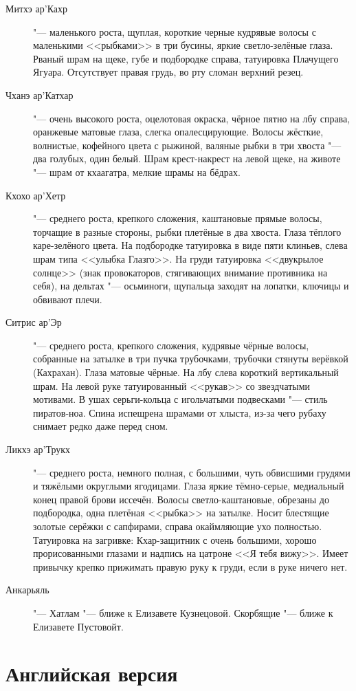 \begin{description}
\item[Митхэ ар'Кахр] "--- маленького роста, щуплая, короткие черные кудрявые волосы с маленькими <<рыбками>> в три бусины, яркие светло-зелёные глаза.
Рваный шрам на щеке, губе и подбородке справа, татуировка Плачущего Ягуара.
Отсутствует правая грудь, во рту сломан верхний резец.
\item[Чханэ ар'Катхар] "--- очень высокого роста, оцелотовая окраска, чёрное пятно на лбу справа, оранжевые матовые глаза, слегка опалесцирующие.
Волосы жёсткие, волнистые, кофейного цвета с рыжиной, валяные рыбки в три хвоста "--- два голубых, один белый.
Шрам крест-накрест на левой щеке, на животе "--- шрам от кхаагатра, мелкие шрамы на бёдрах.
\item[Кхохо ар'Хетр] "--- среднего роста, крепкого сложения, каштановые прямые волосы, торчащие в разные стороны, рыбки плетёные в два хвоста.
Глаза тёплого каре-зелёного цвета.
На подбородке татуировка в виде пяти клиньев, слева шрам типа <<улыбка Глазго>>.
На груди татуировка <<двукрылое солнце>> (знак провокаторов, стягивающих внимание противника на себя), на дельтах "--- осьминоги, щупальца заходят на лопатки, ключицы и обвивают плечи.
\item[Ситрис ар'Эр] "--- среднего роста, крепкого сложения, кудрявые чёрные волосы, собранные на затылке в три пучка трубочками, трубочки стянуты верёвкой (Кахрахан).
Глаза матовые чёрные.
На лбу слева короткий вертикальный шрам.
На левой руке татуированный <<рукав>> со звездчатыми мотивами.
В ушах серьги-кольца с игольчатыми подвесками "--- стиль пиратов-ноа.
Спина испещрена шрамами от хлыста, из-за чего рубаху снимает редко даже перед сном.
\item[Ликхэ ар'Трукх] "--- среднего роста, немного полная, с большими, чуть обвисшими грудями и тяжёлыми округлыми ягодицами.
Глаза яркие тёмно-серые, медиальный конец правой брови иссечён.
Волосы светло-каштановые, обрезаны до подбородка, одна плетёная <<рыбка>> на затылке.
Носит блестящие золотые серёжки с сапфирами, справа окаймляющие ухо полностью.
Татуировка на загривке: Кхар-защитник с очень большими, хорошо прорисованными глазами и надпись на цатроне <<Я тебя вижу>>.
Имеет привычку крепко прижимать правую руку к груди, если в руке ничего нет.
\item[Анкарьяль] "--- Хатлам "--- ближе к Елизавете Кузнецовой.
Скорбящие "--- ближе к Елизавете Пустовойт.
\end{description}

\section{Английская версия}

